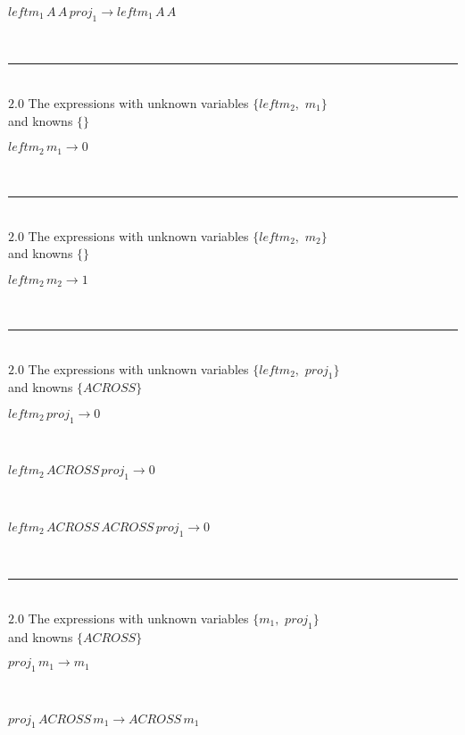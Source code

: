 \documentclass[rep10,leqno]{report}
\begin{document}
\begin{minipage}{6in}
$
leftm_{1}\,
 A\,
 A\,
 proj_{1}\rightarrow leftm_{1}\,
 A\,
 A
$
\end{minipage}\\
\rule[3pt]{6in}{.7pt}\\
$2.0$  The expressions with unknown variables $\{leftm_{2},
$ $
m_{1}\}$\\
and knowns $\{\}$\smallskip\\
\begin{minipage}{6in}
$
leftm_{2}\,
 m_{1}\rightarrow 0
$
\end{minipage}\\
\rule[3pt]{6in}{.7pt}\\
$2.0$  The expressions with unknown variables $\{leftm_{2},
$ $
m_{2}\}$\\
and knowns $\{\}$\smallskip\\
\begin{minipage}{6in}
$
leftm_{2}\,
 m_{2}\rightarrow 1
$
\end{minipage}\\
\rule[3pt]{6in}{.7pt}\\
$2.0$  The expressions with unknown variables $\{leftm_{2},
$ $
proj_{1}\}$\\
and knowns $\{ACROSS\}$\smallskip\\
\begin{minipage}{6in}
$
leftm_{2}\,
 proj_{1}\rightarrow 0
$
\end{minipage}\medskip \\
\begin{minipage}{6in}
$
leftm_{2}\,
 ACROSS\,
 proj_{1}\rightarrow 0
$
\end{minipage}\medskip \\
\begin{minipage}{6in}
$
leftm_{2}\,
 ACROSS\,
 ACROSS\,
 proj_{1}\rightarrow 0
$
\end{minipage}\\
\rule[3pt]{6in}{.7pt}\\
$2.0$  The expressions with unknown variables $\{m_{1},
$ $
proj_{1}\}$\\
and knowns $\{ACROSS\}$\smallskip\\
\begin{minipage}{6in}
$
proj_{1}\,
 m_{1}\rightarrow m_{1}
$
\end{minipage}\medskip \\
\begin{minipage}{6in}
$
proj_{1}\,
 ACROSS\,
 m_{1}\rightarrow ACROSS\,
 m_{1}
$
\end{minipage}\medskip \\
\end{document}
